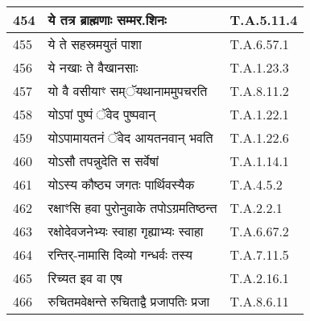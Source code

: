 \documentclass[17pt]{extarticle}
\begin{document}
\begin{longtable}{||p{0.4in}||p{4.9in}||p{0.9in}||}
    \hline
        
    454 & ये तत्र ब्राह्मणाः सम्मर.शिनः & T.A.5.11.4       \\
    
    \hline
        
    455 & ये ते सहस्रमयुतं पाशा & T.A.6.57.1       \\
    
    \hline
        
    456 & ये नखाः ते वैखानसाः & T.A.1.23.3       \\
    
    \hline
        
    457 & यो वै वसीयाꣳ सम्ॅयथानाममुपचरति & T.A.8.11.2       \\
    
    \hline
        
    458 & योऽपां पुष्पं ॅवेद पुष्पवान् & T.A.1.22.1       \\
    
    \hline
        
    459 & योऽपामायतनं ॅवेद आयतनवान् भवति & T.A.1.22.6       \\
    
    \hline
        
    460 & योऽसौ तपन्नुदेति स सर्वेषां & T.A.1.14.1       \\
    
    \hline
        
    461 & योऽस्य कौष्ठ्य जगतः पार्थिवस्यैक & T.A.4.5.2       \\
    
    \hline
        
    462 & रक्षाꣳसि हवा पुरोनुवाके तपोऽग्रमतिष्ठन्त & T.A.2.2.1       \\
    
    \hline
        
    463 & रक्षोदेवजनेभ्यः स्वाहा गृह्याभ्यः स्वाहा & T.A.6.67.2       \\
    
    \hline
        
    464 & रन्तिर्{-}नामासि दिव्यो गन्धर्वः तस्य & T.A.7.11.5       \\
    
    \hline
        
    465 & रिच्यत इव वा एष & T.A.2.16.1       \\
    
    \hline
        
    466 & रुचितमवेक्षन्ते रुचिताद्वै प्रजापतिः प्रजा & T.A.8.6.11       \\
    

\end{longtable}
\end{document}
